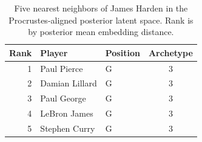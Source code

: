 \begin{table}[htbp]
  \centering\small
  \begin{tabular}{rllc}
    \toprule
    Rank & Player & Position & Archetype \\
    \midrule
    1 & Paul Pierce & G & 3 \\
    2 & Damian Lillard & G & 3 \\
    3 & Paul George & G & 3 \\
    4 & LeBron James & G & 3 \\
    5 & Stephen Curry & G & 3 \\
    \bottomrule
  \end{tabular}
  \caption{Five nearest neighbors of James Harden in the Procrustes-aligned posterior latent space. Rank is by posterior mean embedding distance.}
  \label{tab:James_Harden_neighbors}
\end{table}

